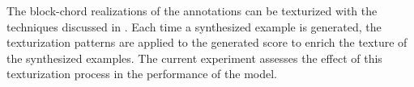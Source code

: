 
The block-chord realizations of the annotations can be
texturized with the techniques discussed in
. Each time a
synthesized example is generated, the texturization patterns
are applied to the generated score to enrich the texture of
the synthesized examples. The current experiment assesses
the effect of this texturization process in the performance
of the model.

